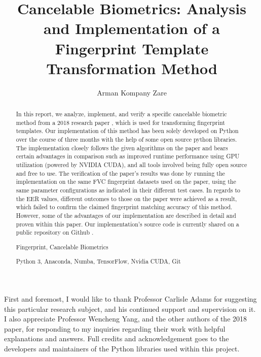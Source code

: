\documentclass[fyp]{socreport}
\begin{document}
\title{Cancelable Biometrics: Analysis and Implementation of a Fingerprint Template Transformation Method}
\author{Arman Kompany Zare}
\maketitle
\begin{abstract}
In this report, we analyze, implement, and verify a specific cancelable biometric method from a 2018 research paper \cite{wencheng18cbio}, which is used for transforming fingerprint templates. Our implementation of this method has been solely developed on Python over the course of three months with the help of some open source python libraries. The implementation closely follows the given algorithms on the paper and bears certain advantages in comparison such as improved runtime performance using GPU utilization (powered by NVIDIA CUDA), and all tools involved being fully open source and free to use. The verification of the paper's results was done by running the implementation on the same FVC fingerprint datasets used on the paper, using the same parameter configurations as indicated in their different test cases. In regards to the EER values, different outcomes to those on the paper were achieved as a result, which failed to confirm the claimed fingerprint matching accuracy of this method. However, some of the advantages of our implementation are described in detail and proven within this paper. Our implementation's source code is currently shared on a public repository on Github \cite{project}. 

\begin{keywords}
	Fingerprint, Cancelable Biometrics
\end{keywords}
\begin{implement}
	Python 3, Anaconda, Numba, TensorFlow, Nvidia CUDA, Git
\end{implement}
\end{abstract}

\begin{acknowledgement}
   First and foremost, I would like to thank Professor Carlisle Adams for suggesting this particular research subject, and his continued support and supervision on it. I also appreciate Professor Wencheng Yang, and the other authors of the 2018 paper, for responding to my inquiries regarding their work with helpful explanations and answers. Full credits and acknowledgement goes to the developers and maintainers of the Python libraries used within this project.
\end{acknowledgement}
\end{document}
